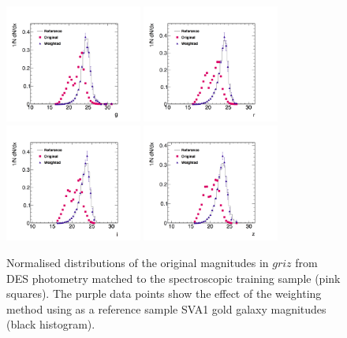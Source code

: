 \begin{figure}\centering
\includegraphics[width=0.4\textwidth]{./chapters/chapter2/figs/varWeightKNN_train_g.png} \includegraphics[width=0.4\textwidth]{./chapters/chapter2/figs/varWeightKNN_ANNZ_train_r.png}\\
\includegraphics[width=0.4\textwidth]{./chapters/chapter2/figs/varWeightKNN_ANNZ_train_i.png} \includegraphics[width=0.4\textwidth]{./chapters/chapter2/figs/varWeightKNN_ANNZ_train_z.png}
\caption{Normalised distributions of the original magnitudes in $griz$ from DES photometry matched to the spectroscopic training sample (pink squares). The purple data points show the effect of the weighting method using as a reference sample SVA1 gold galaxy magnitudes (black histogram).}\label{fig:weight}\end{figure}

